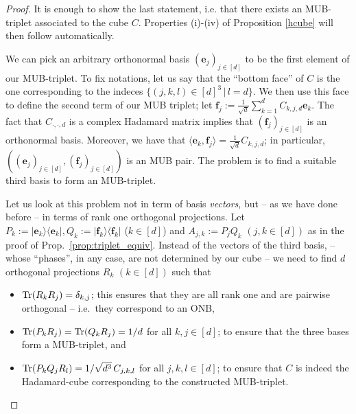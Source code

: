 \documentclass[12pt]{amsart}
\numberwithin{equation}{section}
\theoremstyle{definition}
\theoremstyle{remark}
\theoremstyle{remark}
\newcommand{\eb}{\ensuremath{\mathbf{e}}}
\newcommand{\fb}{\ensuremath{\mathbf{f}}}
\begin{document}
\begin{proof}
It is enough to show the last statement, i.e. that there exists an MUB-triplet associated to the cube $C$. Properties (i)-(iv) of Proposition \ref{hcube} will then follow automatically. 

\medskip

We can pick an arbitrary orthonormal basis $(\eb_j)_{j\in [d]}$ to be the first element of our MUB-triplet. To fix notations, let us say that the ``bottom face'' of $C$ is the one corresponding to the indeces $\{(j,k,l)\in [d]^3\,|\, l=d\}$. We then use this face to  define the second term of our MUB triplet; let
$\fb_j:= \frac{1}{\sqrt{d}} \sum_{k=1}^d C_{k,j,d}\eb_k$. The fact that $C_{\cdot,\cdot,d}$ is a complex Hadamard matrix implies that 
$(\fb_j)_{j\in [d]}$ is an orthonormal basis. Moreover, we have that $\langle \eb_k,\fb_j\rangle =\frac{1}{\sqrt{d}} C_{k,j,d}$; in particular, $\left((\eb_j)_{j\in [d]},(\fb_j)_{j\in [d]}\right)$
is an MUB pair. The  problem is to find a suitable third basis to form an MUB-triplet.  

\medskip

Let us look at this problem not in term of basis {\it vectors}, but -- as we have done before -- in terms of rank one orthogonal projections. Let $P_k:=|\eb_k\rangle\langle\eb_k|, Q_k:= |\fb_k\rangle\langle\fb_k| $ ($k\in [d]$) and $A_{j,k}:=P_jQ_k$ $(j,k\in [d])$ as in the proof of Prop.\ \ref{prop:triplet_equiv}. Instead of the vectors of the third basis, -- whose ``phases'', in any case, are not determined by our cube -- we need to find $d$ orthogonal projections $R_k$ $(k\in [d])$ such that
\begin{itemize}
\item[(a)] ${\rm Tr}(R_k R_j)=\delta_{k,j}$; this ensures that they are all rank one and are pairwise orthogonal -- i.e.\ they correspond to an ONB,
\item[(b)] ${\rm Tr}(P_k R_j)={\rm Tr}(Q_k R_j)=1/d$ for all $k,j\in [d]$; to ensure that the three bases form a MUB-triplet, and
\item[(c)] ${\rm Tr}(P_k Q_jR_l)= 1/\sqrt{d^3} \, C_{j,k,l}$ for all $j,k,l\in [d]$; to ensure that $C$ is indeed the Hadamard-cube corresponding to the constructed MUB-triplet.
\end{itemize}


\end{proof}
\end{document}
